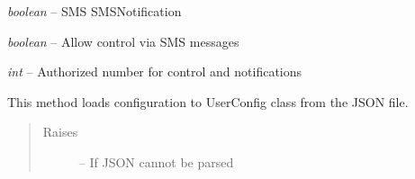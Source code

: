 \documentclass[letterpaper,10pt,english,openany]{sphinxmanual}
\begin{document}
\begin{fulllineitems}
\begin{fulllineitems}
\end{fulllineitems}


\begin{fulllineitems}
\label{rpicameramon:rpicameramon.config.UserConfig.SMSNotification}
\emph{boolean} -- SMS SMSNotification

\end{fulllineitems}


\begin{fulllineitems}
\label{rpicameramon:rpicameramon.config.UserConfig.SMSControl}
\emph{boolean} -- Allow control via SMS messages

\end{fulllineitems}


\begin{fulllineitems}
\label{rpicameramon:rpicameramon.config.UserConfig.authorizedNumber}
\emph{int} -- Authorized number for control and notifications

\end{fulllineitems}


\begin{fulllineitems}
\label{rpicameramon:rpicameramon.config.UserConfig.load_config}
This method loads configuration to UserConfig class from the JSON file.
\begin{quote}\begin{description}
\item[{Raises}] \leavevmode
{} -- If JSON cannot be parsed

\end{description}\end{quote}

\end{fulllineitems}


\end{fulllineitems}
\end{document}
